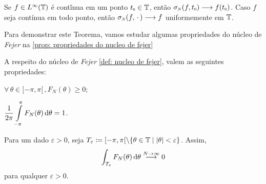 \documentclass[../main.tex]{subfiles}
\begin{document}
\begin{teorema}
    Se $f\in L^\infty(\mathbb T)$ é contĩnua em um ponto $\sub t0 \in \UnitalCircle$, então $\sub\sigma N(f, \sub t0) \longto f(\sub t0)$. Caso $f$ seja contínua em todo ponto, então $\sub\sigma N(f, \come) \longto f$ uniformemente em $\mathbb T$.
\end{teorema}
Para demonstrar este Teorema, vamos estudar algumas propriedades do núcleo de \textit{Fejer} na \ref{prop: propriedades do nucleo de fejer}
\begin{proposicao}
    \label{prop: propriedades do nucleo de fejer}
    A respeito do núcleo de \textit{Fejer} \ref{def: nucleo de fejer}, valem as seguintes propriedades:
    \begin{itroman}
        \item $\forall\,\theta \in [-\pi, \pi[\,, F_N(\theta) \geqslant 0$;
        \item $\displaystyle \dfrac1{2\pi} \int\limits_{-\pi}^\pi F_N(\theta)\,{\operatorname{d}}{\theta} = 1$.
        \item Para um dado $\varepsilon > 0$, seja $T_\varepsilon \coloneqq [-\pi, \pi[ \backslash \{\theta \in \mathbb T \mid |\theta| < \varepsilon\}$. Assim, 
        $$
        \int_{T_\varepsilon} F_N(\theta)\,{\operatorname{d}}{\theta} \overset{N \to \infty}{\longrightarrow} 0
        $$
        para qualquer $\varepsilon > 0$.
    \end{itroman}
\end{proposicao}
\end{document}
